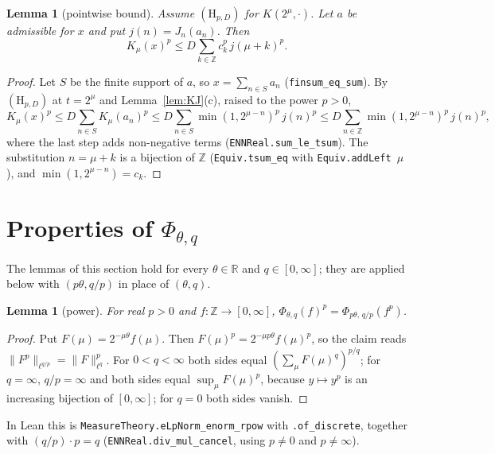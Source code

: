 \documentclass[11pt]{article}
\newtheorem{lemma}[theorem]{Lemma}
\theoremstyle{definition}
\theoremstyle{remark}
\newcommand{\norm}[2]{\lVert #1\rVert_{#2}}
\newcommand{\Z}{\mathbb Z}
\begin{document}
\begin{lemma}[pointwise bound]\label{lem:pointwise}
  Assume \((\mathrm H_{p,D})\) for \(K(2^\mu,\cdot)\). Let \(a\) be admissible for \(x\) and put
  \(j(n) = J_n(a_n)\). Then
  \[
    K_\mu(x)^p \le D\sum_{k \in \Z} c_k^p\, j(\mu+k)^p .
  \]
\end{lemma}

\begin{proof}
  Let \(S\) be the finite support of \(a\), so \(x = \sum_{n \in S} a_n\)
  (\texttt{finsum\_eq\_sum}). By \((\mathrm H_{p,D})\) at \(t = 2^\mu\) and
  Lemma~\ref{lem:KJ}(c), raised to the power \(p > 0\),
  \[
    K_\mu(x)^p \le D \sum_{n \in S} K_\mu(a_n)^p
    \le D \sum_{n \in S} \min(1,2^{\mu-n})^p\, j(n)^p
    \le D \sum_{n \in \Z} \min(1,2^{\mu-n})^p\, j(n)^p ,
  \]
  where the last step adds non-negative terms (\texttt{ENNReal.sum\_le\_tsum}). The substitution
  \(n = \mu + k\) is a bijection of \(\Z\) (\texttt{Equiv.tsum\_eq} with
  \texttt{Equiv.addLeft \(\mu\)}), and \(\min(1,2^{\mu-n}) = c_k\).
\end{proof}

\section{Properties of \texorpdfstring{\(\Phi_{\theta,q}\)}{Phi}}

The lemmas of this section hold for every \(\theta \in \mathbb R\) and \(q \in [0,\infty]\);
they are applied below with \((p\theta, q/p)\) in place of \((\theta, q)\).

\begin{lemma}[power]\label{lem:power}
  For real \(p > 0\) and \(f \colon \Z \to [0,\infty]\),
  \(\Phi_{\theta,q}(f)^p = \Phi_{p\theta,\,q/p}(f^p)\).
\end{lemma}

\begin{proof}
  Put \(F(\mu) = 2^{-\mu\theta}f(\mu)\). Then \(F(\mu)^p = 2^{-\mu p\theta}f(\mu)^p\), so the
  claim reads \(\norm{F^p}{\ell^{q/p}} = \norm{F}{\ell^q}^p\). For \(0 < q < \infty\) both
  sides equal \((\sum_\mu F(\mu)^q)^{p/q}\); for \(q = \infty\), \(q/p = \infty\) and both sides
  equal \(\sup_\mu F(\mu)^p\), because \(y \mapsto y^p\) is an increasing bijection of
  \([0,\infty]\); for \(q = 0\) both sides vanish.
\end{proof}

In Lean this is \texttt{MeasureTheory.eLpNorm\_enorm\_rpow} with \texttt{.of\_discrete},
together with \((q/p)\cdot p = q\) (\texttt{ENNReal.div\_mul\_cancel}, using \(p \ne 0\) and
\(p \ne \infty\)).
\end{document}
